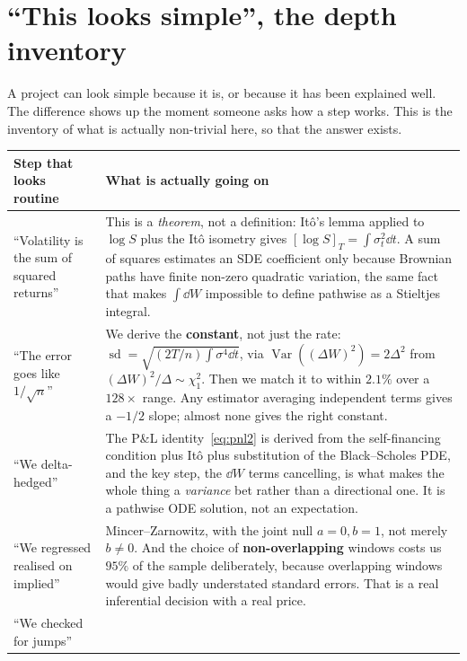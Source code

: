 \documentclass[11pt,a4paper]{article}
\begin{document}
\section{``This looks simple'', the depth inventory}
\label{sec:depth}

A project can look simple because it is, or because it has been explained well. The difference
shows up the moment someone asks how a step works. This is the inventory of what is actually
non-trivial here, so that the answer exists.

\begin{table}[H]
\centering\small
\begin{tabular}{L{4.9cm}L{10.3cm}}
\toprule
\textbf{Step that looks routine} & \textbf{What is actually going on} \\
\midrule
``Volatility is the sum of squared returns'' &
This is a \emph{theorem}, not a definition: It\^o's lemma applied to $\log S$ plus the It\^o
isometry gives $[\log S]_T=\int\sigma_t^2\dd t$. A sum of squares estimates an SDE coefficient
only because Brownian paths have finite non-zero quadratic variation, the same fact that
makes $\int\dd W$ impossible to define pathwise as a Stieltjes integral. \\
\addlinespace
``The error goes like $1/\sqrt n$'' &
We derive the \textbf{constant}, not just the rate:
$\operatorname{sd}=\sqrt{(2T/n)\int\sigma^4\dd t}$, via
$\operatorname{Var}((\Delta W)^2)=2\Delta^2$ from $(\Delta W)^2/\Delta\sim\chi^2_1$. Then we
match it to within $2.1\%$ over a $128\times$ range. Any estimator averaging independent terms
gives a $-1/2$ slope; almost none gives the right constant. \\
\addlinespace
``We delta-hedged'' &
The P\&L identity~\eqref{eq:pnl2} is derived from the self-financing condition plus It\^o plus
substitution of the Black--Scholes PDE, and the key step, the $\dd W$ terms cancelling, is
what makes the whole thing a \emph{variance} bet rather than a directional one. It is a
pathwise ODE solution, not an expectation. \\
\addlinespace
``We regressed realised on implied'' &
Mincer--Zarnowitz, with the joint null $a=0,b=1$, not merely $b\ne0$. And the choice of
\textbf{non-overlapping} windows costs us $95\%$ of the sample deliberately, because
overlapping windows would give badly understated standard errors. That is a real inferential
decision with a real price. \\
\addlinespace
``We checked for jumps'' &

\end{tabular}
\end{table}
\end{document}
